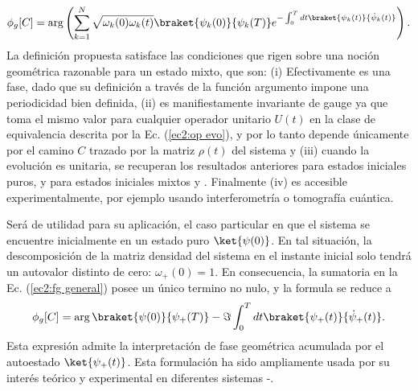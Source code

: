 \begin{equation}
    \phi_g[C]=\arg \left( \sum_{k=1}^{N} \sqrt{\omega_k(0)\omega_k(t)} \braket{\psi_k(0)}{\psi_k(T)}e^{-\int_{0}^{T}dt\braket{\psi_k(t)}{\dot\psi_k(t)}} \right).
    \label{ec2:fg general}
\end{equation}
La definición propuesta satisface las condiciones que rigen sobre una noción geométrica razonable para un estado mixto, que son: (i) Efectivamente es una fase, dado que su definición a través de la función argumento impone una periodicidad bien definida, (ii) es manifiestamente invariante de gauge ya que toma el mismo valor para cualquier operador unitario $U(t)$ en la clase de equivalencia descrita por la Ec. (\ref{ec2:op evo}), y por lo tanto depende únicamente por el camino $C$ trazado por la matriz $\rho(t)$ del sistema y (iii) cuando la evolución es unitaria, se recuperan los resultados anteriores para estados iniciales puros, y para estados iniciales mixtos \cite{Singh2003} y \cite{Sjoqvist2000}. Finalmente (iv) es accesible experimentalmente, por ejemplo usando interferometría o tomografía cuántica.

Será de utilidad para su aplicación, el caso particular en que el sistema se encuentre inicialmente en un estado puro $\ket{\psi(0)}$. En tal situación, la descomposición de la matriz densidad del sistema en el instante inicial solo tendrá un autovalor distinto de cero: $\omega_+(0)=1$. En consecuencia, la sumatoria en la Ec. (\ref{ec2:fg general}) posee un único termino no nulo, y la formula se reduce a 
\begin{equation}
    \phi_g[C]=\arg{\braket{\psi(0)}{\psi_+(T)}}-\Im \int_{0}^{T}dt \braket{\psi_+(t)}{\dot\psi_+(t)}.
    \label{ec2:fg general puro}
\end{equation}
Esta expresión admite la interpretación de fase geométrica acumulada por el autoestado $\ket{\psi_+(t)}$. Esta formulación ha sido ampliamente usada por su interés teórico y experimental en diferentes sistemas \cite{fg1}-\cite{fg6}.
